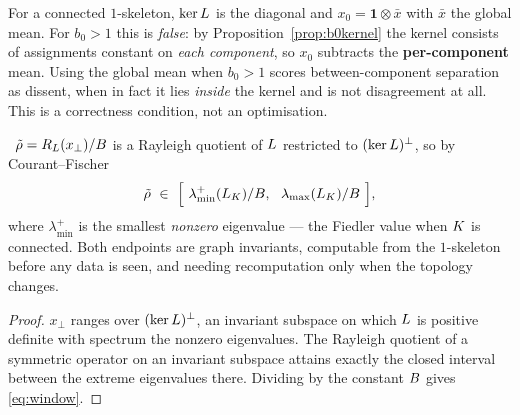 \begin{remark}\label{rem:percomp}
For a connected $1$-skeleton, $\ker L$ is the diagonal and
$x_0=\mathbf1\otimes\bar x$ with $\bar x$ the global mean. For $b_0>1$
this is \emph{false}: by Proposition~\ref{prop:b0kernel} the kernel
consists of assignments constant on \emph{each component}, so $x_0$
subtracts the \textbf{per-component} mean. Using the global mean when
$b_0>1$ scores between-component separation as dissent, when in fact it
lies \emph{inside} the kernel and is not disagreement at all. This is a
correctness condition, not an optimisation.
\end{remark}

\begin{proposition}\label{prop:window}
\ProvedCond\ $\tilde{\rho}=R_L(x_\perp)/B$ is a Rayleigh quotient of
$L$ restricted to $(\ker L)^\perp$, so by Courant--Fischer
\begin{equation}\label{eq:window}
  \tilde{\rho}\ \in\
  \Bigl[\ \lambda^{+}_{\min}(L_K)/B,\ \
          \lambda_{\max}(L_K)/B\ \Bigr],
\end{equation}
where $\lambda^{+}_{\min}$ is the smallest \emph{nonzero} eigenvalue ---
the Fiedler value when $K$ is connected. Both endpoints are graph
invariants, computable from the $1$-skeleton before any data is seen,
and needing recomputation only when the topology changes.
\end{proposition}
\begin{proof}
$x_\perp$ ranges over $(\ker L)^\perp$, an invariant subspace on which
$L$ is positive definite with spectrum the nonzero eigenvalues. The
Rayleigh quotient of a symmetric operator on an invariant subspace
attains exactly the closed interval between the extreme eigenvalues
there. Dividing by the constant $B$ gives \eqref{eq:window}.
\end{proof}

